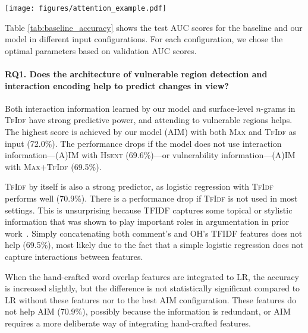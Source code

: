 \documentclass[11pt,a4paper]{article}
\newcommand{\hsent}{\textsc{Hsent}}
\newcommand{\tfidf}{\textsc{TfIdf}}
\newcommand{\mmax}{\textsc{Max}}
\newcommand{\IM}{(A)IM}
\begin{document}
\begin{figure*}
    \centering
    \texttt{[image: figures/attention\_example.pdf]}
    \caption{Example discussion with the OH's initial post (left), a successful comment (top right), and an unsuccessful comment (bottom right). The OH's post is colored based on attention weights (the higher attention the brighter). Sentences with college and SAT sections (\emph{reading}, \emph{writing}, \emph{math}) get more attention than sentences with other subjects (\emph{algebra}, \emph{geometry}). The successful comment addresses parts with high attention, whereas the unsuccessful comment addresses parts with low attention.\label{fig:attention_example}}
\end{figure*}


Table \ref{tab:baseline_accuracy} shows the test AUC scores for the baseline and our model in different input configurations. For each configuration, we chose the optimal parameters based on validation AUC scores.

\paragraph{RQ1. Does the architecture of vulnerable region detection and interaction encoding help to predict changes in view?}
Both interaction information learned by our model and surface-level $n$-grams in \tfidf{} have strong predictive power, and attending to vulnerable regions helps. The highest score is achieved by our model (AIM) with both \mmax{} and \tfidf{} as input (72.0\%). The performance drops if the model does not use interaction information---\IM{} with \hsent{} (69.6\%)---or vulnerability information---\IM{} with \mmax{}+\tfidf{} (69.5\%). 

\tfidf{} by itself is also a strong predictor, as logistic regression with \tfidf{} performs well (70.9\%).
There is a performance drop if \tfidf{} is not used in most settings. This is unsurprising because TFIDF captures some topical or stylistic information that was shown to play important roles in argumentation in prior work~\cite{Tan:2016bk,Wei:2016ui}. Simply concatenating both comment's and OH's TFIDF features does not help (69.5\%), most likely due to the fact that a simple logistic regression does not capture interactions between features.

When the hand-crafted word overlap features are integrated to LR, the accuracy is increased slightly, but the difference is not statistically significant compared to LR without these features nor to the best AIM configuration. These features do not help AIM (70.9\%), possibly because the information is redundant, or AIM requires a more deliberate way of integrating hand-crafted features.
\end{document}
